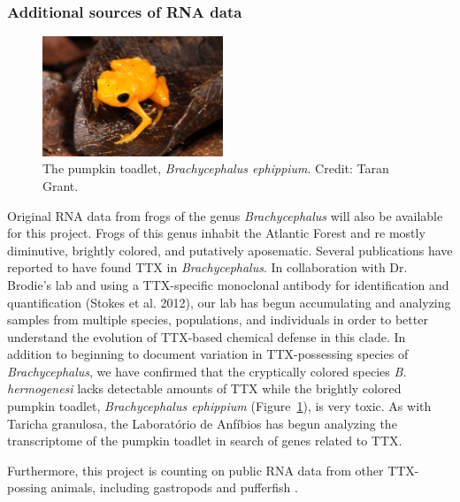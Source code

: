 \subsubsection{Additional sources of RNA data}

\begin{figure}
    \centering
    \vspace{-\intextsep}\hspace*{-.75\columnsep}
    \includegraphics[width=0.48\textwidth]{figs/brachy.jpg}
    \caption{The pumpkin toadlet, \textit{Brachycephalus ephippium}. Credit: Taran Grant.}
    \label{fig:brachy}
\end{figure}

Original RNA data from frogs of the genus \textit{Brachycephalus} will also be available for this project. Frogs of this genus inhabit the Atlantic Forest and re mostly diminutive, brightly colored, and putatively aposematic. Several publications have reported to have found TTX \citep{sebben1986tetrodotoxin, pires2002occurrence, pires2005further} in \textit{Brachycephalus}. In collaboration with Dr. Brodie’s lab and using a TTX-specific monoclonal antibody for identification and quantification (Stokes et al. 2012), our lab has begun accumulating and analyzing samples from multiple species, populations, and individuals in order to better understand the evolution of TTX-based chemical defense in this clade. In addition to beginning to document variation in TTX-possessing species of \textit{Brachycephalus}, we have confirmed that the cryptically colored species \textit{B. hermogenesi} lacks detectable amounts of TTX while the brightly colored pumpkin toadlet, \textit{Brachycephalus ephippium} (Figure~\ref{fig:brachy}),  is very toxic. As with Taricha granulosa, the Laboratório de Anfíbios has begun analyzing the transcriptome of the pumpkin toadlet in search of genes related to TTX.

Furthermore, this project is counting on public RNA data from other TTX-possing animals, including gastropods and pufferfish \citep[e.g.,][]{aparicio2002whole, gao2014draft, kudo2014draft, jaillon2004genome}.

